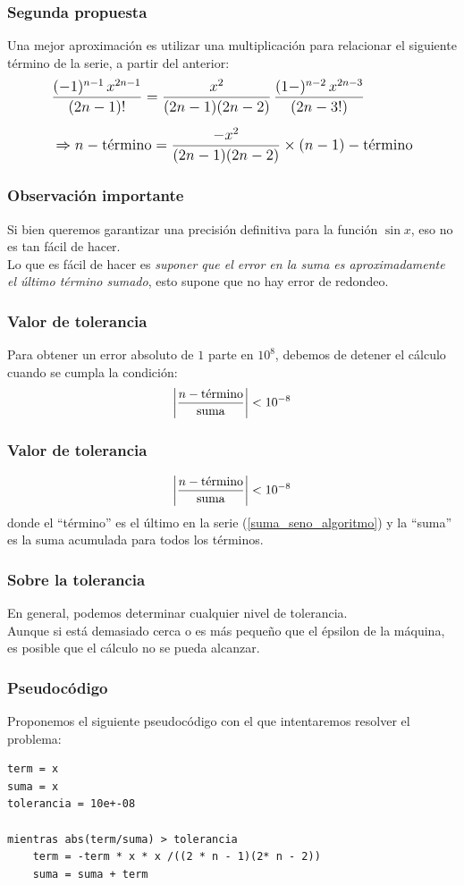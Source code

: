 \begin{frame}
\frametitle{Segunda propuesta}
Una mejor aproximación es utilizar una multiplicación para relacionar el siguiente término de la serie, a partir del anterior:
\begin{align}
\fontsize{12}{12}\selectfont
\begin{aligned}
&\dfrac{(-1)^{n-1} \, x^{2 n - 1}}{(2 n - 1)!} = \dfrac{x^{2}}{(2 n - 1)(2 n - 2)} \, \dfrac{(1-)^{n-2} \, x^{2 n - 3}}{(2 n - 3!)} \\[0.5em]
&\Rightarrow n-\mbox{término} = \dfrac{- x^{2}}{(2 n - 1)(2 n - 2)} \times (n-1)-\mbox{término}
\end{aligned}
\label{eq:termino_suma}
\end{align}
\end{frame}
\begin{frame}
\frametitle{Observación importante}
Si bien queremos garantizar una precisión definitiva para la función $\sin x$, eso no es tan fácil de hacer.
\\
\bigskip
\pause
Lo que es fácil de hacer es \emph{suponer que el error en la suma es aproximadamente el último término sumado}, esto supone que no hay error de redondeo.
\end{frame}
\begin{frame}
\frametitle{Valor de tolerancia}
Para obtener un error absoluto de $1$ parte en $10^{8}$, debemos de detener el cálculo cuando se cumpla la condición:
\begin{align}
\abs{\dfrac{n-\mbox{término}}{\mbox{suma}}} < 10^{-8}
\label{eq:tolerancia}
\end{align}
\end{frame}
\begin{frame}
\frametitle{Valor de tolerancia}
\begin{align*}
\abs{\dfrac{n-\mbox{término}}{\mbox{suma}}} < 10^{-8}
\end{align*}
donde el \enquote{término} es el último en la serie (\ref{suma_seno_algoritmo}) y la \enquote{suma} es la suma acumulada para todos los términos.
\end{frame}
\begin{frame}
\frametitle{Sobre la tolerancia}
En general, podemos determinar cualquier nivel de tolerancia.
\\
\bigskip
Aunque si está demasiado cerca o es más pequeño que el épsilon de la máquina, es posible que el cálculo no se pueda alcanzar.
\end{frame}
\begin{frame}[fragile]
\frametitle{Pseudocódigo}
Proponemos el siguiente pseudocódigo con el que intentaremos resolver el problema:
\begin{lstlisting}
term = x
suma = x
tolerancia = 10e+-08

mientras abs(term/suma) > tolerancia
    term = -term * x * x /((2 * n - 1)(2* n - 2))
    suma = suma + term
\end{lstlisting}
\end{frame}
